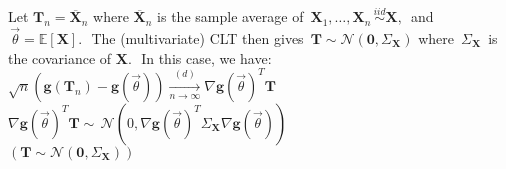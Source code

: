 Let $\mathbf{T}_ n=\overline{\mathbf{X}}_ n$ where $\overline{\mathbf{X}}_ n$ is the sample average of $\, \mathbf{X}_1,\ldots ,\mathbf{X}_ n\, \stackrel{iid}{\sim }\mathbf{X},\,$ and $\, \vec{\theta }=\mathbb E[\mathbf{X}].\, \,$ The (multivariate) CLT then gives $\, \mathbf{T}\sim \mathcal{N}(\mathbf{0},\Sigma _\mathbf{X})$ where $\, \Sigma _\mathbf{X}\,$ is the covariance of $\mathbf{X}.\, \,$ In this case, we have:\\

$\sqrt{n} \left(\mathbf{g}(\mathbf{T}_ n) - \mathbf{g}(\vec{\theta }) \right) \xrightarrow [n\to \infty ]{(d)} \nabla \mathbf{g}(\vec{\theta })^ T\mathbf{T}\,$\\

$\nabla \mathbf{g}(\vec{\theta })^ T\mathbf{T} \sim \,  \mathcal{N}\left(0, \nabla \mathbf{g}(\vec{\theta })^ T \Sigma _{\mathbf{X}} \nabla \mathbf{g}(\vec{\theta })\right)\qquad$\\

$(\mathbf{T}\sim \mathcal{N}(\mathbf{0},\Sigma _\mathbf{X}))$\\